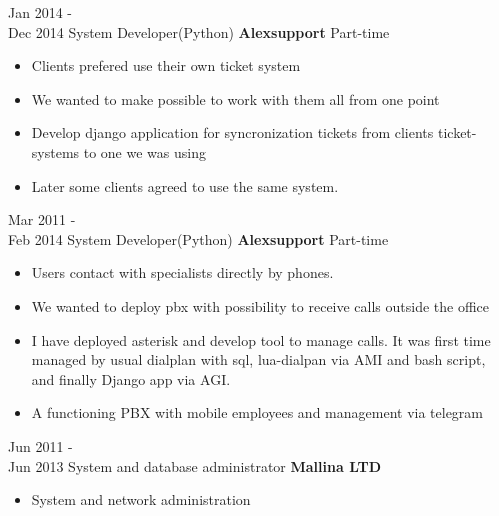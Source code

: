 \documentclass[letterpaper]{twentysecondcv} %
\begin{document}
\begin{twenty}
    \twentyitem
        {Jan 2014 - \\ Dec 2014}
        {System Developer(Python)}
        {\textbf{Alexsupport}}
        {Part-time}
        {
            \begin{itemize}
                \item Clients prefered use their own ticket system
                \item We wanted to make possible to work with them all from one point
                \item Develop django application for syncronization tickets from clients ticket-systems to one we was using
                \item Later some clients agreed to use the same system.
            \end{itemize}
        }
    \twentyitem
        {Mar 2011 - \\ Feb 2014}
        {System Developer(Python) }
        {\textbf{Alexsupport}}
        {Part-time}
        {
            \begin{itemize}
                \item Users contact with specialists directly by phones.
                \item We wanted to deploy pbx with possibility to receive calls outside the office
                \item I have deployed asterisk and develop tool to manage calls.
                It was first time managed by usual dialplan with sql,
                lua-dialpan via AMI and bash script, and finally Django app via AGI.
                \item A functioning PBX with mobile employees and management via telegram
            \end{itemize}
        }

    \twentyitem
        {Jun 2011 - \\ Jun 2013}
        {System and database administrator }
        {\textbf{Mallina LTD}}
        {}
        {
            \begin{itemize}
                \item System and network administration
            \end{itemize}
        }


\end{twenty}
\end{document}
